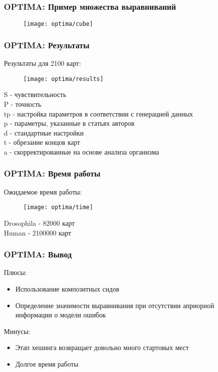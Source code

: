 \begin{frame}
\frametitle{OPTIMA: Пример множества выравниваний}
\begin{figure}
  \centering
  \texttt{[image: optima/cube]}
\end{figure}
\end{frame}



\begin{frame}
\frametitle{OPTIMA: Результаты}
Результаты для 2100 карт:
\begin{figure}
  \centering
  \texttt{[image: optima/results]}
\end{figure}
S - чувствительность \\
P - точность \\
tp - настройка параметров в соответствии с генерацией данных \\
p - параметры, указанные в статьях авторов \\
d - стандартные настройки \\
t - обрезание концов карт \\
a - скорректированные на основе анализа организма
\end{frame}

\begin{frame}
\frametitle{OPTIMA: Время работы}
Ожидаемое время работы:
\begin{figure}
  \centering
  \texttt{[image: optima/time]}
\end{figure}
Drosophila - 82000 карт \\
Human - 2100000 карт
\end{frame}

\begin{frame}
\frametitle{OPTIMA: Вывод }
Плюсы:
\begin{itemize}
  \item Использование композитных сидов
  \item Определение значимости выравнивания при отсутствии априорной информации о модели ошибок
\end{itemize}
Минусы:
\begin{itemize}
  \item Этап хешинга возвращает довольно много стартовых мест
  \item Долгое время работы
\end{itemize}
\end{frame}
